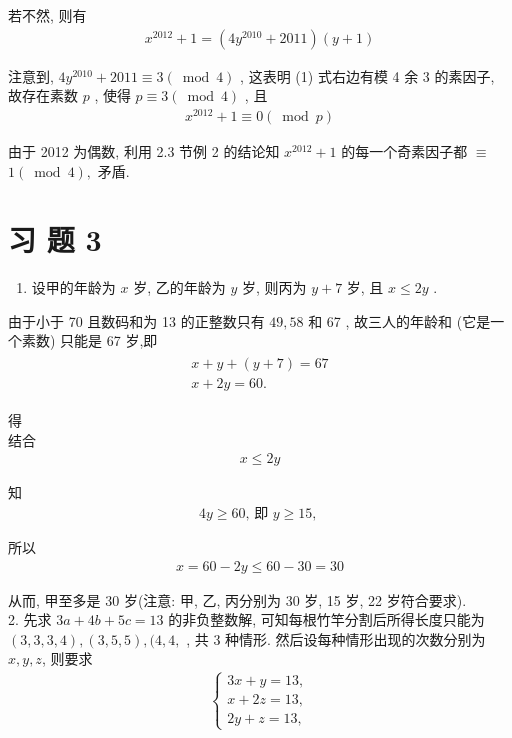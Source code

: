 若不然, 则有
\begin{align*}
	x^{2012}+1=\left(4 y^{2010}+2011\right)(y+1)
\end{align*}

注意到,  $4 y^{2010}+2011 \equiv 3(\bmod 4)$ , 这表明 (1) 式右边有模 4 余 3 的素因子, 故存在素数 $p$ , 使得 $p \equiv 3(\bmod 4)$ , 且
\begin{align*}
	x^{2012}+1 \equiv 0(\bmod p)
\end{align*}

由于 2012 为偶数, 利用 2.3 节例 2 的结论知 $x^{2012}+1$ 的每一个奇素因子都 $\equiv$ $1(\bmod 4) , $ 矛盾.

\section{习 题 3}
\begin{enumerate}
	\item 设甲的年龄为 $x$ 岁, 乙的年龄为 $y$ 岁, 则丙为 $y+7$ 岁, 且 $x \leqslant 2 y$ .
\end{enumerate}

由于小于 70 且数码和为 13 的正整数只有 $49 ,  58$ 和 67 , 故三人的年龄和 (它是一个素数) 只能是 67 岁,即
\begin{align*}
	\begin{gathered}
		x+y+(y+7)=67 \\
		x+2 y=60 .
	\end{gathered}
\end{align*}

得\\
结合
\begin{align*}
	x \leqslant 2 y
\end{align*}

知
\begin{align*}
	4 y \geqslant 60 \text {, 即 } y \geqslant 15 \text {, }
\end{align*}

所以
\begin{align*}
	x=60-2 y \leqslant 60-30=30
\end{align*}

从而, 甲至多是 30 岁(注意: 甲, 乙, 丙分别为 30 岁,  15 岁,  22 岁符合要求). \\
2. 先求 $3 a+4 b+5 c=13$ 的非负整数解, 可知每根竹竿分割后所得长度只能为 $(3,3,3,4) , (3,5,5) ,  ( 4 ,  4 , $ , 共 3 种情形. 然后设每种情形出现的次数分别为 $x ,  y ,  z$, 则要求
\begin{align*}
	\left\{\begin{array}{l}
		       3 x+y=13, \\
		       x+2 z=13, \\
		       2 y+z=13,
	       \end{array}\right.
\end{align*}

